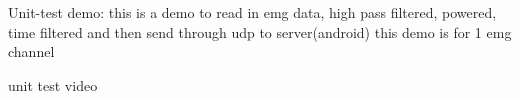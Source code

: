 Unit-\/test demo\+: this is a demo to read in emg data, high pass filtered, powered, time filtered and then send through udp to server(android) this demo is for 1 emg channel

unit test video 